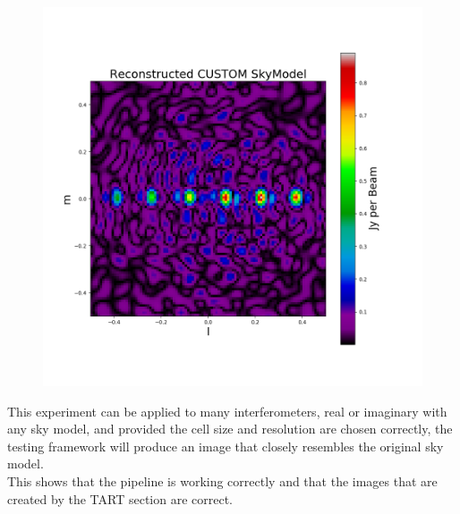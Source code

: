 \begin{figure}[H]
    \centering
    \includegraphics[scale=0.35]{images/TESTING_KAT7_LINEMODEL_RECON.png}
    \caption{}
    \label{fig:line_model_recon}
\end{figure}
This experiment can be applied to many interferometers, real or imaginary with any sky model, and provided the cell size and resolution are chosen correctly, the testing framework will produce an image that closely resembles the original sky model.\\
This shows that the pipeline is working correctly and that the images that are created by the TART section are correct.
